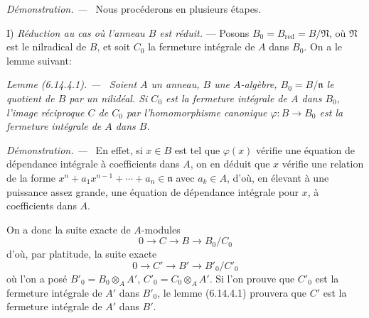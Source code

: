 \documentclass[10pt,oneside]{book}
\newenvironment{lemma}[1][]{%
  \par\medskip\noindent\itshape Lemme (#1). ---\ }{\par}
\newenvironment{proof}{%
  \par\medskip\noindent\textit{Démonstration. ---\ }}{\par}
\begin{document}
\begin{proof}
Nous procéderons en plusieurs étapes.

I) \emph{Réduction au cas où l'anneau $B$ est réduit.} --- Posons
$B_0=B_{\mathrm{red}}=B/\mathfrak N$, où $\mathfrak N$ est le nilradical
de $B$, et soit $C_0$ la fermeture intégrale de $A$ dans $B_0$. On a le
lemme suivant:

\begin{lemma}[6.14.4.1]
\label{IV.2.s6.14.4.1-fr}
Soient $A$ un anneau, $B$ une $A$-algèbre, $B_0=B/\mathfrak n$ le quotient
de $B$ par un nilidéal. Si $C_0$ est la fermeture intégrale de $A$ dans
$B_0$, l'image réciproque $C$ de $C_0$ par l'homomorphisme canonique
$\varphi:B\to B_0$ est la fermeture intégrale de $A$ dans $B$.
\end{lemma}

\begin{proof}
En effet, si $x\in B$ est tel que $\varphi(x)$ vérifie une équation de
dépendance intégrale à coefficients dans $A$, on en déduit que $x$ vérifie
une relation de la forme
$x^n+a_1x^{n-1}+\cdots+a_n\in\mathfrak n$ avec $a_k\in A$, d'où, en
élevant à une puissance assez grande, une équation de dépendance intégrale
pour $x$, à coefficients dans $A$.
\end{proof}

On a donc la suite exacte de $A$-modules
\[
0\longrightarrow C\longrightarrow B\longrightarrow B_0/C_0
\]
d'où, par platitude, la suite exacte
\[
0\longrightarrow C'\longrightarrow B'\longrightarrow B'_0/C'_0
\]
où l'on a posé $B'_0=B_0\otimes_A A'$, $C'_0=C_0\otimes_A A'$. Si l'on
prouve que $C'_0$ est la fermeture intégrale de $A'$ dans $B'_0$, le lemme
(6.14.4.1) prouvera que $C'$ est la fermeture intégrale de $A'$ dans $B'$.


\end{proof}
\end{document}
